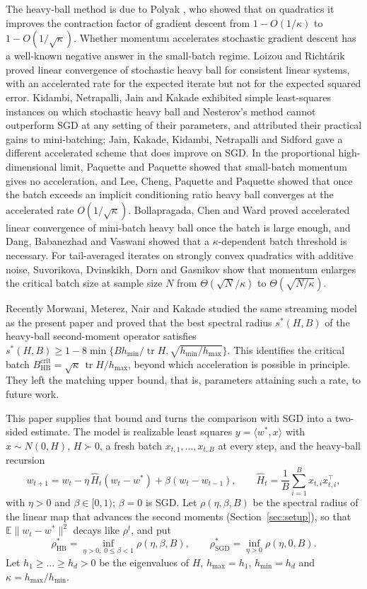 \documentclass[11pt]{amsart}
\theoremstyle{definition}
\theoremstyle{remark}
\numberwithin{equation}{section}
\newcommand{\tr}{\operatorname{tr}}
\newcommand{\E}{\mathbb{E}}
\newcommand{\hmax}{h_{\max}}
\newcommand{\hmin}{h_{\min}}
\begin{document}
The heavy-ball method is due to Polyak \cite{Pol64}, who showed that on quadratics it improves the contraction factor of gradient descent from $1-O(1/\kappa)$ to $1-O(1/\sqrt\kappa)$. Whether momentum accelerates stochastic gradient descent has a well-known negative answer in the small-batch regime. Loizou and Richt\'arik \cite{LR20} proved linear convergence of stochastic heavy ball for consistent linear systems, with an accelerated rate for the expected iterate but not for the expected squared error. Kidambi, Netrapalli, Jain and Kakade \cite{KNJK18} exhibited simple least-squares instances on which stochastic heavy ball and Nesterov's method cannot outperform SGD at any setting of their parameters, and attributed their practical gains to mini-batching; Jain, Kakade, Kidambi, Netrapalli and Sidford \cite{JKKNS18} gave a different accelerated scheme that does improve on SGD. In the proportional high-dimensional limit, Paquette and Paquette \cite{PP21} showed that small-batch momentum gives no acceleration, and Lee, Cheng, Paquette and Paquette \cite{LCPP22} showed that once the batch exceeds an implicit conditioning ratio heavy ball converges at the accelerated rate $O(1/\sqrt\kappa)$. Bollapragada, Chen and Ward \cite{BCW25} proved accelerated linear convergence of mini-batch heavy ball once the batch is large enough, and Dang, Babanezhad and Vaswani \cite{DBV25} showed that a $\kappa$-dependent batch threshold is necessary. For tail-averaged iterates on strongly convex quadratics with additive noise, Suvorikova, Dvinskikh, Dorn and Gasnikov \cite{SDDG26} show that momentum enlarges the critical batch size at sample size $N$ from $\Theta(\sqrt N/\kappa)$ to $\Theta(\sqrt{N/\kappa})$.

Recently Morwani, Meterez, Nair and Kakade \cite{MMNK26} studied the same streaming model as the present paper and proved that the best spectral radius $s^*(H,B)$ of the heavy-ball second-moment operator satisfies $s^*(H,B)\ge 1-8\min\{B\hmin/\tr H,\sqrt{\hmin/\hmax}\}$. This identifies the critical batch $B^{\mathrm{crit}}_{\mathrm{HB}}=\sqrt\kappa\,\tr H/\hmax$, beyond which acceleration is possible in principle. They left the matching upper bound, that is, parameters attaining such a rate, to future work.

This paper supplies that bound and turns the comparison with SGD into a two-sided estimate. The model is realizable least squares $y=\langle w^*,x\rangle$ with $x\sim N(0,H)$, $H\succ0$, a fresh batch $x_{t,1},\dots,x_{t,B}$ at every step, and the heavy-ball recursion
\begin{equation}\label{eq:hb}
w_{t+1}=w_t-\eta\,\widehat H_t(w_t-w^*)+\beta(w_t-w_{t-1}),\qquad \widehat H_t=\frac1B\sum_{i=1}^B x_{t,i}x_{t,i}^{\top},
\end{equation}
with $\eta>0$ and $\beta\in[0,1)$; $\beta=0$ is SGD. Let $\rho(\eta,\beta,B)$ be the spectral radius of the linear map that advances the second moments (Section~\ref{sec:setup}), so that $\E\|w_t-w^*\|^2$ decays like $\rho^t$, and put
\[
\rho_{\mathrm{HB}}^*=\inf_{\eta>0,\;0\le\beta<1}\rho(\eta,\beta,B),\qquad \rho_{\mathrm{SGD}}^*=\inf_{\eta>0}\rho(\eta,0,B).
\]
Let $h_1\ge\dots\ge h_d>0$ be the eigenvalues of $H$, $\hmax=h_1$, $\hmin=h_d$ and $\kappa=\hmax/\hmin$.
\end{document}
